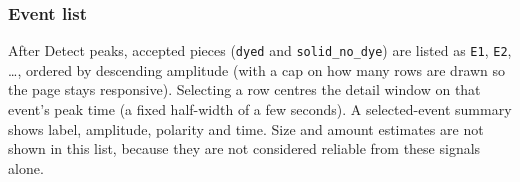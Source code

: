 \subsubsection{Event list}
\label{sec:vis-events}
After Detect peaks, accepted pieces (\texttt{dyed} and \texttt{solid\_no\_dye}) are listed as
\texttt{E1}, \texttt{E2}, \ldots, ordered by descending amplitude (with a cap on how many
rows are drawn so the page stays responsive). Selecting a row centres the detail window on
that event's peak time (a fixed half-width of a few seconds). A selected-event summary shows
label, amplitude, polarity and time. Size and amount estimates are not shown in this list,
because they are not considered reliable from these signals alone.
